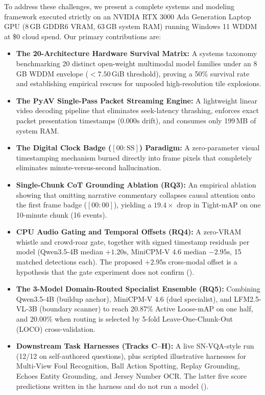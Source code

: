 \documentclass[10pt,twocolumn,letterpaper]{article}
\begin{document}
To address these challenges, we present a complete systems and modeling framework executed strictly on an NVIDIA RTX 3000 Ada Generation Laptop GPU (8\,GB GDDR6 VRAM, 63\,GB system RAM) running Windows 11 WDDM at \$0 cloud spend. Our primary contributions are:
\begin{itemize}
    \item \textbf{The 20-Architecture Hardware Survival Matrix:} A systems taxonomy benchmarking 20 distinct open-weight multimodal model families under an 8\,GB WDDM envelope ($<7.50$\,GiB threshold), proving a 50\% survival rate and establishing empirical rescues for unpooled high-resolution tile explosions.
    \item \textbf{The PyAV Single-Pass Packet Streaming Engine:} A lightweight linear video decoding pipeline that eliminates seek-latency thrashing, enforces exact packet presentation timestamps ($0.000\text{s}$ drift), and consumes only 199\,MB of system RAM.
    \item \textbf{The Digital Clock Badge ($[00:\text{SS}]$) Paradigm:} A zero-parameter visual timestamping mechanism burned directly into frame pixels that completely eliminates minute-versus-second hallucination.
    \item \textbf{Single-Chunk CoT Grounding Ablation (RQ3):} An empirical ablation showing that omitting narrative commentary collapses causal attention onto the first frame badge ($[00:00]$), yielding a $19.4\times$ drop in Tight-mAP on one 10-minute chunk (16 events).
    \item \textbf{CPU Audio Gating and Temporal Offsets (RQ4):} A zero-VRAM whistle and crowd-roar gate, together with signed timestamp residuals per model (Qwen3.5-4B median $+1.20\text{s}$, MiniCPM-V 4.6 median $-2.95\text{s}$, 15 matched detections each). The proposed $+2.95\text{s}$ cross-modal offset is a hypothesis that the gate experiment does not confirm ().
    \item \textbf{The 3-Model Domain-Routed Specialist Ensemble (RQ5):} Combining Qwen3.5-4B (buildup anchor), MiniCPM-V 4.6 (duel specialist), and LFM2.5-VL-3B (boundary scanner) to reach 20.87\% Active Loose-mAP on one half, and 20.00\% when routing is selected by 5-fold Leave-One-Chunk-Out (LOCO) cross-validation.
    \item \textbf{Downstream Task Harnesses (Tracks C--H):} A live SN-VQA-style run (12/12 on self-authored questions), plus scripted illustrative harnesses for Multi-View Foul Recognition, Ball Action Spotting, Replay Grounding, Echoes Entity Grounding, and Jersey Number OCR. The latter five score predictions written in the harness and do not run a model ().
\end{itemize}
\end{document}

